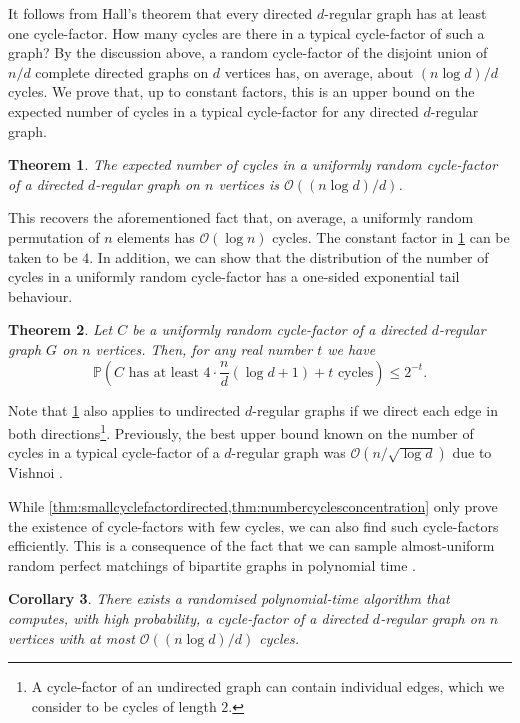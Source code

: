 \documentclass[11pt]{article}
\theoremstyle{plain}
\newtheorem{theorem}{Theorem}[section]
\newtheorem{corollary}[theorem]{Corollary}
\theoremstyle{definition}
\newcommand{\pr}{\mathbb{P}}
\newcommand{\cO}{\mathcal O}
\begin{document}
It follows from Hall's theorem that every directed $d$-regular graph has at least one cycle-factor. How many cycles are there in a typical cycle-factor of such a graph? By the discussion above, a random cycle-factor of the disjoint union of $n/d$ complete directed graphs on $d$ vertices has, on average, about $(n \log d) / d$ cycles. We prove that, up to constant factors, this is an upper bound on the expected number of cycles in a typical cycle-factor for any directed $d$-regular graph.

\begin{theorem}\label{thm:smallcyclefactordirected}
   The expected number of cycles in a uniformly random cycle-factor of a directed $d$-regular graph on $n$ vertices is $\cO((n\log d)/d)$.
\end{theorem}

This recovers the aforementioned fact that, on average, a uniformly random permutation of $n$ elements has $\cO(\log n)$ cycles. The constant factor in \cref{thm:smallcyclefactordirected} can be taken to be $4$. In addition, we can show that the distribution of the number of cycles in a uniformly random cycle-factor has a one-sided exponential tail behaviour.

\begin{theorem}\label{thm:numbercyclesconcentration}
    Let $C$ be a uniformly random cycle-factor of a directed $d$-regular graph $G$ on $n$ vertices. Then, for any real number $t$ we have
    \[
        \pr\left(C \text{ has at least } 4 \cdot \frac{n}{d} (\log d + 1) + t \text{ cycles}\right) \le 2^{-t}.
    \]
\end{theorem}

Note that \cref{thm:smallcyclefactordirected} also applies to undirected $d$-regular graphs if we direct each edge in both directions\footnote{A cycle-factor of an undirected graph can contain individual edges, which we consider to be cycles of length $2$.}. Previously, the best upper bound known on the number of cycles in a typical cycle-factor of a $d$-regular graph was $\cO({n/\!\sqrt{\log d}})$ due to Vishnoi \cite{vishnoi2012permanent}.

While \cref{thm:smallcyclefactordirected,thm:numbercyclesconcentration} only prove the existence of cycle-factors with few cycles, we can also find such cycle-factors efficiently. 
This is a consequence of the fact that we can sample almost-uniform random perfect matchings of bipartite graphs in polynomial time \cite{jerrum2004polynomial}.

\begin{corollary}\label{cor:algorithmsmallcyclefactordirected}
    There exists a randomised polynomial-time algorithm that computes, with high probability, a cycle-factor of a directed $d$-regular graph on $n$ vertices with at most $\cO((n\log d)/d)$ cycles.
\end{corollary}
\end{document}
